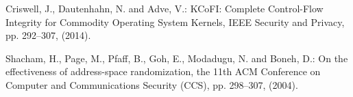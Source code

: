 \documentclass[paper]{ieice}
\begin{document}
\begin{thebibliography}{99}
  Criswell, J., Dautenhahn, N. and Adve, V.: KCoFI: Complete Control-Flow Integrity for Commodity Operating System Kernels, IEEE Security and Privacy, pp. 292--307, (2014).


 Shacham, H., Page, M., Pfaff, B., Goh, E., Modadugu, N. and Boneh, D.: On the effectiveness of address-space randomization, the 11th ACM Conference on Computer and Communications Security (CCS), pp. 298--307, (2004).
  

\end{thebibliography}
\end{document}
